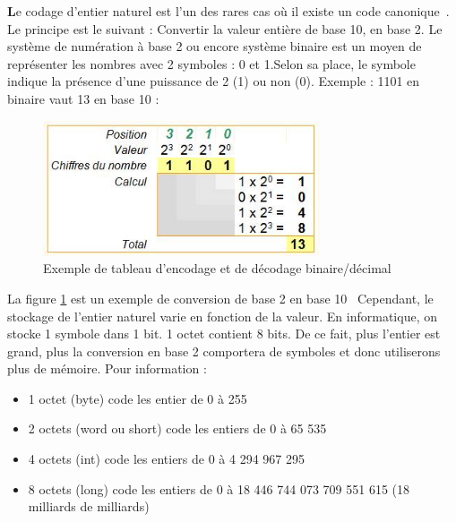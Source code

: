 \documentclass{article}
\begin{document}
\newpage
\textbf{L}e codage d'entier naturel est l'un des rares cas o\`u il existe un code canonique~\cite{Cours_intro_info}.\newline
Le principe est le suivant : Convertir la valeur enti\`ere de base 10, en base 2.\newline
Le syst\`eme de num\'eration \`a base 2 ou encore syst\`eme binaire est un moyen de repr\'esenter les nombres avec 2 symboles : 0 et 1.\newline   Selon sa place, le symbole indique la pr\'esence d'une puissance de 2 (1) ou non (0). 
\newline Exemple : 1101 en binaire vaut 13  en base 10 :
\newline
\begin{figure}[H]
\begin{center}
	\includegraphics[height=4cm]{image1.jpg}
	\caption[Exemple 1]{Exemple de tableau d'encodage et de d\'ecodage binaire/d\'ecimal}
	\label{fig:ex1}
\end{center}
\end{figure}
La figure \ref{fig:ex1} est un exemple de conversion de base 2 en base 10~\cite{Entier_naturel}
\newline Cependant, le stockage de l'entier naturel varie en fonction de la valeur. En informatique, on stocke 1 symbole dans 1 bit. 1 octet contient 8 bits. De ce fait, plus l'entier est grand, plus la conversion en base 2 comportera de symboles et donc utiliserons plus de m\'emoire.\newline 
\newline Pour information :
\begin{itemize}
\item 1 octet (byte) code les entier de 0 \`a 255
\item 2 octets (word ou short) code les entiers de 0 \`a 65 535
\item 4 octets (int) code les entiers de 0 \`a 4 294 967 295
\item 8 octets (long) code les entiers de 0 \`a 18 446 744 073 709 551 615 (18 milliards de milliards)
\end{itemize}
\end{document}
